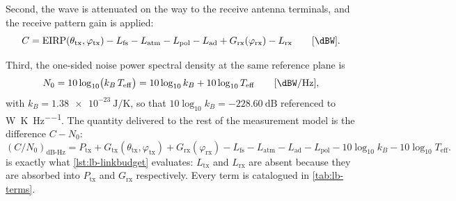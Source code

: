 Second, the wave is attenuated on the way to the receive antenna terminals,
and the receive pattern gain is applied:
\begin{equation}
  C
  =
  \mathrm{EIRP}(\theta_\mathrm{tx}, \varphi_\mathrm{tx})
  - L_\mathrm{fs}
  - L_\mathrm{atm}
  - L_\mathrm{pol}
  - L_\mathrm{ad}
  + G_\mathrm{rx}(\varphi_\mathrm{rx})
  - L_\mathrm{rx}
  \qquad [\si{\dBW}].
  \label{eq:lb-carrier}
\end{equation}

Third, the one-sided noise power spectral density at the same reference plane
is
\begin{equation}
  N_0
  =
  10\log_{10}\!\big(k_B\,T_\mathrm{eff}\big)
  =
  10\log_{10} k_B + 10\log_{10} T_\mathrm{eff}
  \qquad [\si{\dBW\per\hertz}],
  \label{eq:lb-n0}
\end{equation}
with $k_B = \SI{1.38e-23}{\joule\per\kelvin}$, so that
$10\log_{10} k_B = \SI{-228.60}{\dB}$ referenced to \si{\watt\per\kelvin\per\hertz}.
The quantity delivered to the rest of the measurement model is the difference
$C - N_0$:
\begin{equation}
  \left(C/N_0\right)_{\mathrm{dB\text{-}Hz}}
  =
  P_\mathrm{tx}
  + G_\mathrm{tx}(\theta_\mathrm{tx}, \varphi_\mathrm{tx})
  + G_\mathrm{rx}(\varphi_\mathrm{rx})
  - L_\mathrm{fs}
  - L_\mathrm{atm}
  - L_\mathrm{ad}
  - L_\mathrm{pol}
  - 10\log_{10} k_B
  - 10\log_{10} T_\mathrm{eff}.
  \label{eq:lb-cn0}
\end{equation}
 is exactly what \cref{lst:lb-linkbudget} evaluates:
$L_\mathrm{tx}$ and $L_\mathrm{rx}$ are absent because they are absorbed into
$P_\mathrm{tx}$ and $G_\mathrm{rx}$ respectively.  Every term is catalogued in
\cref{tab:lb-terms}.

